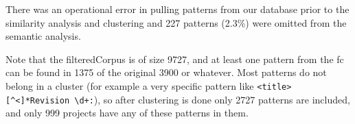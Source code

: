 There was an operational error in pulling  patterns from our database prior to the similarity analysis and clustering and 227 patterns (2.3\%) were omitted from the semantic analysis.

Note that the filteredCorpus is of size 9727, and at least one pattern from the fc can be found in 1375 of the original 3900 or whatever.  Most patterns do not belong in a cluster (for example a very specific pattern like \verb!<title>[^<]*Revision \d+:!), so after clustering is done only 2727 patterns are included, and only 999 projects have any of these patterns in them.

